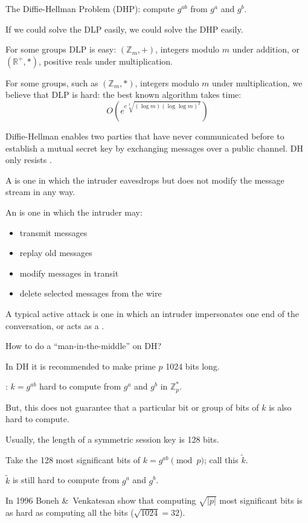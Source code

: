 \begin{frame}
The Diffie-Hellman Problem (DHP): compute $g^{ab}$ from $g^a$ and
$g^b$.

If we could solve the DLP easily, we could solve the DHP easily.

For some groups DLP is easy: $(\mathbb{Z}_m,+)$, integers modulo $m$
under addition, or $(\mathbb{R}^+,\ast)$, positive reals under
multiplication.

For some groups, such as $(\mathbb{Z}_m,\ast)$, integers modulo $m$
under multiplication, we believe that DLP is hard: the best known
algorithm takes time:
$$
O\left(e^{c\sqrt[3]{(\log m)(\log\log m)^2}}\right)
$$
\end{frame}

\begin{frame}
Diffie-Hellman enables two parties that have never communicated before to
establish a mutual secret key by exchanging messages over a public
channel.
DH only resists .

A  is one in which the intruder eavesdrops but does
not modify the message stream in any way.

An  is one in which the intruder may:
\begin{itemize}
\item  transmit messages
\item  replay old messages
\item  modify messages in transit
\item  delete selected messages from the wire
\end{itemize}
A typical active attack is one in which an intruder impersonates one
end of the conversation, or acts as a .

How to do a ``man-in-the-middle'' on DH?
\end{frame}

\begin{frame}
In DH it is recommended to make prime $p$ 1024 bits long.

: $k=g^{ab}$ hard to compute from $g^a$ and $g^b$ in
$\mathbb{Z}_p^*$.  

But, this does not guarantee that a particular bit
or group of bits of $k$ is also hard to compute.

Usually, the length of a symmetric session key is 128 bits.

Take the 128 most significant bits of $k=g^{ab}\pmod p$;
call this $\tilde{k}$.

$\tilde{k}$ is still hard to compute from $g^a$ and $g^b$.

In 1996 Boneh \&\ Venkatesan show that computing $\sqrt{|p|}$ most
significant bits is as hard as computing all the bits ($\sqrt{1024}=32$).
\end{frame}

